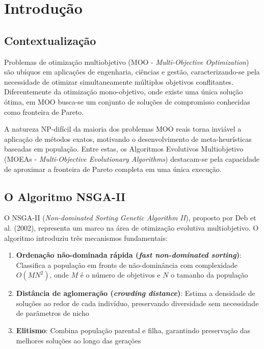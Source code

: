 
\section{Introdução}

\subsection{Contextualização}

Problemas de otimização multiobjetivo (MOO - \textit{Multi-Objective Optimization}) são ubíquos em aplicações de engenharia, ciências e gestão, caracterizando-se pela necessidade de otimizar simultaneamente múltiplos objetivos conflitantes. Diferentemente da otimização mono-objetivo, onde existe uma única solução ótima, em MOO busca-se um conjunto de soluções de compromisso conhecidas como fronteira de Pareto.

A natureza NP-difícil da maioria dos problemas MOO reais torna inviável a aplicação de métodos exatos, motivando o desenvolvimento de meta-heurísticas baseadas em população. Entre estas, os Algoritmos Evolutivos Multiobjetivo (MOEAs - \textit{Multi-Objective Evolutionary Algorithms}) destacam-se pela capacidade de aproximar a fronteira de Pareto completa em uma única execução.

\subsection{O Algoritmo NSGA-II}

O NSGA-II (\textit{Non-dominated Sorting Genetic Algorithm II}), proposto por Deb et al. (2002), representa um marco na área de otimização evolutiva multiobjetivo. O algoritmo introduziu três mecanismos fundamentais:

\begin{enumerate}
    \item \textbf{Ordenação não-dominada rápida (\textit{fast non-dominated sorting})}: Classifica a população em fronts de não-dominância com complexidade $O(MN^2)$, onde $M$ é o número de objetivos e $N$ o tamanho da população
    
    \item \textbf{Distância de aglomeração (\textit{crowding distance})}: Estima a densidade de soluções ao redor de cada indivíduo, preservando diversidade sem necessidade de parâmetros de nicho
    
    \item \textbf{Elitismo}: Combina população parental e filha, garantindo preservação das melhores soluções ao longo das gerações
\end{enumerate}

